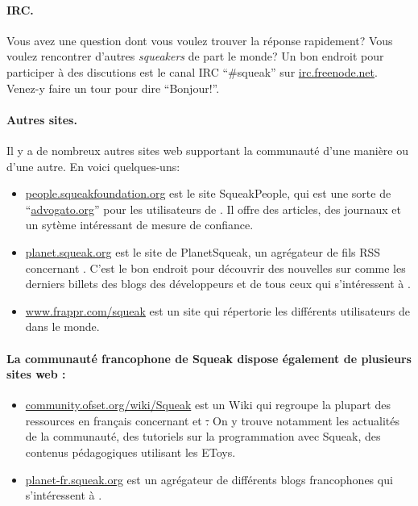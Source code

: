 \documentclass[a4paper,10pt,twoside]{book}
\begin{document}
\paragraph{IRC.}
Vous avez une question dont vous voulez trouver la r\'eponse
rapidement? Vous voulez rencontrer d'autres \emph{squeakers} de part
le monde? Un bon endroit pour participer \`a des discutions est le
canal IRC ``\#squeak'' sur \url{irc.freenode.net}. 
Venez-y faire un tour pour dire ``Bonjour!''.

\paragraph{Autres sites.} Il y a de nombreux autres sites web supportant la communaut\'e \sq d'une mani\`ere ou d'une autre. En voici quelques-uns:
\begin{itemize}
  \item \url{people.squeakfoundation.org} est le site
    \textsf{SqueakPeople}, qui est une sorte de
    ``\url{advogato.org}'' pour les utilisateurs de \sq. Il offre des articles, des journaux et un syt\`eme int\'eressant de mesure de confiance.

  \item \url{planet.squeak.org} est le site de \textsf{PlanetSqueak},
    un agr\'egateur de fils RSS concernant \sq. C'est le bon endroit
    pour d\'ecouvrir des nouvelles sur \sq comme les derniers billets
    des blogs des d\'eveloppeurs et de tous ceux qui s'int\'eressent \`a \sq.
    
  \item \url{www.frappr.com/squeak} est un site qui r\'epertorie les
    diff\'erents utilisateurs de \sq dans le monde.

\end{itemize}

\paragraph{La communaut\'e francophone de Squeak dispose \'egalement de plusieurs sites web :}
 \begin{itemize}
 \item \url{community.ofset.org/wiki/Squeak} est un Wiki qui regroupe la plupart des ressources en fran\c{c}ais concernant \sq et \st. On y trouve notamment les actualit\'es de la communaut\'e, des tutoriels sur la programmation avec Squeak, des contenus p\'edagogiques utilisant les EToys.
 \item \url{planet-fr.squeak.org} est un agr\'egateur de diff\'erents blogs francophones qui s'int\'eressent \`a \sq.
 \end{itemize}
\end{document}
